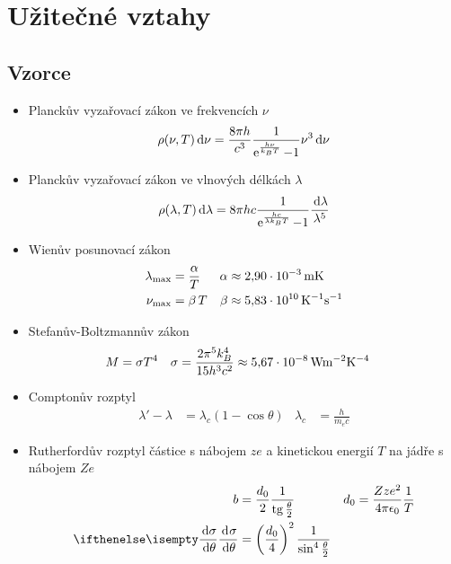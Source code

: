 \section{Užitečné vztahy}

\subsection{Vzorce}
\begin{itemize}
    \item Planckův vyzařovací zákon ve frekvencích $\nu$
        \begin{equation}
            \rho(\nu,T)\,\mathrm{d}\nu=\frac{8\pi h}{c^{3}}\frac{1}{\operatorname{e}^{\frac{h\nu}{k_{B}T}}-1}\nu^{3}\,\mathrm{d}\nu
        \end{equation}

    \item Planckův vyzařovací zákon ve vlnových délkách $\lambda$
        \begin{equation}
            \rho(\lambda,T)\,\mathrm{d}\lambda=8\pi h c\frac{1}{\operatorname{e}^{\frac{h c}{\lambda k_{B}T}}-1}\frac{\,\mathrm{d}\lambda}{\lambda^{5}}
        \end{equation}

    \item Wienův posunovací zákon
        \begin{align}
            \lambda_{\mathrm{max}}&=\frac{\alpha}{T}&\alpha&\approx 2,\!90\cdot10^{-3}\,\mathrm{{mK}}\\
            \nu_{\mathrm{max}}&=\beta\,T & \beta&\approx 5,\!83\cdot 10^{10}\,\mathrm{{K^{-1}s^{-1}}}
        \end{align}

    \item Stefanův-Boltzmannův zákon
        \begin{align}
            M&=\sigma T^{4} & \sigma&=\frac{2\pi^{5}k_{B}^{4}}{15h^{3}c^{2}}\approx 5,\!67\cdot10^{-8}\,\mathrm{{Wm^{-2}K^{-4}}}
        \end{align}

    \item Comptonův rozptyl
        \begin{align}
            \lambda'-\lambda&=\lambda_{c}\left(1-\cos\theta\right) & \lambda_{c}&=\frac{h}{m_{e}c}
        \end{align}

    \item Rutherfordův rozptyl částice s nábojem $ze$ a kinetickou energií $T$ na jádře s nábojem $Ze$
        \begin{align}
            b&=\frac{d_{0}}{2}\frac{1}{\tg{\frac{\theta}{2}}} & d_{0}&=\frac{Zze^{2}}{4\pi\epsilon_{0}}\frac{1}{T}\\
            \derivative{\sigma}{\theta}&=\left(\frac{d_{0}}{4}\right)^{2}\frac{1}{\sin^{4}{\frac{\theta}{2}}}
        \end{align}


\end{itemize}
